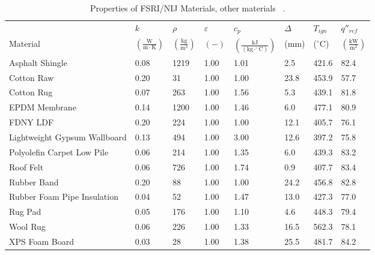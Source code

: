 \clearpage


\begin{table}[!h]
\caption[Properties of FSRI/NIJ Materials, other materials]{Properties of FSRI/NIJ Materials, other materials ~\cite{McKinnon:FSRI2023_Data}.}
\centering
\begin{tabular}{|p{5.5cm}|p{1.0cm}|p{1.0cm}|p{0.8cm}|p{1.4cm}|p{1.0cm}|p{1.0cm}|p{1.2cm}|}
\hline
                                               & $k$    & $\rho$      & $\varepsilon$   & $c_{p}$ & $\Delta$    & $T_{ign}$ & $q''_{ref}$ \\
Material                                       & $\mathrm{\left(\frac{W}{m\cdot K}\right)}$ & $\mathrm{\left(\frac{kg}{m^{3}}\right)}$ & $\mathrm{( - )}$ & $\mathrm{\left(\frac{kJ}{(kg\cdot ^{\circ}C)}\right)}$ &  ($\mathrm{mm}$)   & ($\mathrm{^{\circ}C}$) & $\mathrm{\left(\frac{kW}{m^{2}}\right)}$ \\ \hline
\hline
Asphalt Shingle & 0.08 & 1219 & 1.00 & 1.01 & 2.5& 421.6 & 82.4 \\ \hline 
Cotton Raw & 0.20 & 31 & 1.00 & 1.00 & 23.8 & 453.9 & 57.7 \\ \hline 
Cotton Rug & 0.07 & 263 & 1.00 & 1.56 & 5.3 & 439.1 & 81.8 \\ \hline 
EPDM Membrane & 0.14 & 1200 & 1.00 & 1.46 & 6.0 & 477.1 & 80.9 \\ \hline 
FDNY LDF & 0.20 & 224 & 1.00 & 1.00 & 12.1 & 405.7 & 76.1 \\ \hline 
Lightweight Gypsum Wallboard & 0.13 & 494 & 1.00 & 3.00 & 12.6 & 397.2 & 75.8 \\ \hline 
Polyolefin Carpet Low Pile & 0.06 & 214 & 1.00 & 1.35 & 6.0 & 439.3 & 83.2 \\ \hline 
Roof Felt & 0.06 & 726 & 1.00 & 1.74 & 0.9 & 407.7 & 83.4 \\ \hline 
Rubber Band & 0.20 & 88 & 1.00 & 1.00 & 24.2 & 456.8 & 82.8 \\ \hline 
Rubber Foam Pipe Insulation & 0.04 & 52 & 1.00 & 1.47 & 13.0 & 427.3 & 77.0 \\ \hline 
Rug Pad & 0.05 & 176 & 1.00 & 1.10 & 4.6 & 448.3 & 79.4 \\ \hline 
Wool Rug & 0.06 & 226 & 1.00 & 1.33 & 16.5 & 562.3 & 78.1 \\ \hline 
XPS Foam Board & 0.03 & 28 & 1.00 & 1.38 & 25.5 & 481.7 & 84.2 \\ \hline 
\end{tabular}
\label{Properties_FSRI_NIJ_Materials_others}
\end{table}

